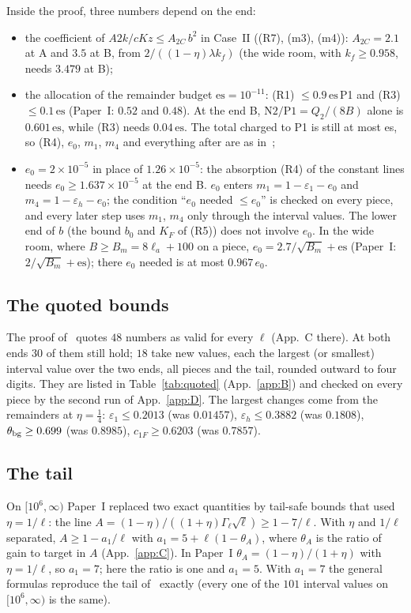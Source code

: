 Inside the proof, three numbers depend on the end:
\begin{itemize}
\item the coefficient of $A2k/cKz\le A_{2C}\,b^2$ in Case~II ((R7), (m3), (m4)): $A_{2C}=2.1$ at A and $3.5$ at B, from $2/((1-\eta)\lambda k_f)$ (the wide room, with $k_f\ge0.958$, needs $3.479$ at B);
\item the allocation of the remainder budget $\mathrm{es}=10^{-11}$: (R1) $\le0.9\,\mathrm{es}\,$P1 and (R3) $\le0.1\,\mathrm{es}$ (Paper~I: $0.52$ and $0.48$). At the end B, $\mathrm{N2}/\mathrm{P1}=Q_2/(8B)$ alone is $0.601\,\mathrm{es}$, while (R3) needs $0.04\,\mathrm{es}$. The total charged to P1 is still at most es, so (R4), $e_0$, $m_1$, $m_4$ and everything after are as in~\cite{I};
\item $e_0=2\times10^{-5}$ in place of $1.26\times10^{-5}$: the absorption (R4) of the constant lines needs $e_0\ge1.637\times10^{-5}$ at the end B. $e_0$ enters $m_1=1-\varepsilon_1-e_0$ and $m_4=1-\varepsilon_h-e_0$; the condition ``$e_0$ needed $\le e_0$'' is checked on every piece, and every later step uses $m_1$, $m_4$ only through the interval values. The lower end of $b$ (the bound $b_0$ and $K_F$ of (R5)) does not involve $e_0$. In the wide room, where $B\ge B_m=8\ell_a+100$ on a piece, $e_0=2.7/\sqrt{B_m}+\mathrm{es}$ (Paper~I: $2/\sqrt{B_m}+\mathrm{es}$); there $e_0$ needed is at most $0.967\,e_0$.
\end{itemize}

\subsection{The quoted bounds}
The proof of~\cite{I} quotes $48$ numbers as valid for every $\ell$ (App.~C there).
At both ends $30$ of them still hold; $18$ take new values, each the largest (or smallest) interval value over the two ends, all pieces and the tail, rounded outward to four digits.
They are listed in Table~\ref{tab:quoted} (App.~\ref{app:B}) and checked on every piece by the second run of App.~\ref{app:D}.
The largest changes come from the remainders at $\eta=\tfrac14$: $\varepsilon_1\le0.2013$ (was $0.01457$), $\varepsilon_h\le0.3882$ (was $0.1808$), $\theta_{\rm bg}\ge0.699$ (was $0.8985$), $c_{1F}\ge0.6203$ (was $0.7857$).

\subsection{The tail}
On $[10^6,\infty)$ Paper~I replaced two exact quantities by tail-safe bounds that used $\eta=1/\ell$: the line $A=(1-\eta)/((1+\eta)\Gamma_\ell\sqrt\ell)\ge1-7/\ell$.
With $\eta$ and $1/\ell$ separated, $A\ge1-a_1/\ell$ with $a_1=5+\ell(1-\theta_A)$, where $\theta_A$ is the ratio of gain to target in $A$ (App.~\ref{app:C}).
In Paper~I $\theta_A=(1-\eta)/(1+\eta)$ with $\eta=1/\ell$, so $a_1=7$; here the ratio is one and $a_1=5$.
With $a_1=7$ the general formulas reproduce the tail of~\cite{I} exactly (every one of the $101$ interval values on $[10^6,\infty)$ is the same).
